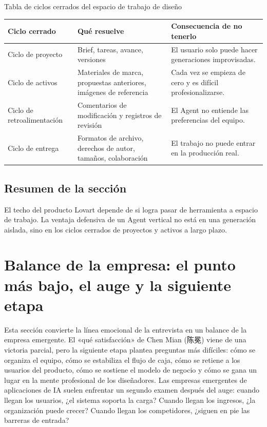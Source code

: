 \documentclass[a4paper]{article}
\begin{document}
\begin{knowledgebox}{Tabla de ciclos cerrados del espacio de trabajo de diseño}
\begin{tabularx}{\textwidth}{p{}p{}X}
\toprule
Ciclo cerrado & Qué resuelve & Consecuencia de no tenerlo \\
\midrule
Ciclo de proyecto & Brief, tareas, avance, versiones & El usuario solo puede hacer generaciones improvisadas. \\
Ciclo de activos & Materiales de marca, propuestas anteriores, imágenes de referencia & Cada vez se empieza de cero y es difícil profesionalizarse. \\
Ciclo de retroalimentación & Comentarios de modificación y registros de revisión & El Agent no entiende las preferencias del equipo. \\
Ciclo de entrega & Formatos de archivo, derechos de autor, tamaños, colaboración & El trabajo no puede entrar en la producción real. \\
\bottomrule
\end{tabularx}
\end{knowledgebox}

\subsection{Resumen de la sección}

El techo del producto Lovart depende de si logra pasar de herramienta a espacio de trabajo. La ventaja defensiva de un Agent vertical no está en una generación aislada, sino en los ciclos cerrados de proyectos y activos a largo plazo.
\section{Balance de la empresa: el punto más bajo, el auge y la siguiente etapa}

Esta sección convierte la línea emocional de la entrevista en un balance de la empresa emergente. El «qué satisfacción» de Chen Mian (陈冕) viene de una victoria parcial, pero la siguiente etapa plantea preguntas más difíciles: cómo se organiza el equipo, cómo se estabiliza el flujo de caja, cómo se retiene a los usuarios del producto, cómo se sostiene el modelo de negocio y cómo se gana un lugar en la mente profesional de los diseñadores. Las empresas emergentes de aplicaciones de IA suelen enfrentar un segundo examen después del auge: cuando llegan los usuarios, ¿el sistema soporta la carga? Cuando llegan los ingresos, ¿la organización puede crecer? Cuando llegan los competidores, ¿siguen en pie las barreras de entrada?
\end{document}
